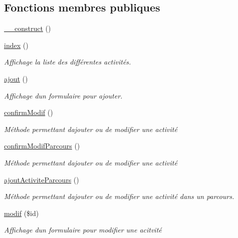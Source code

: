 \subsection*{Fonctions membres publiques}
\begin{DoxyCompactItemize}
\item 
\hyperlink{class_activites_a18b43832d87f4b797b324dfdaa29171d}{\+\_\+\+\_\+construct} ()
\item 
\hyperlink{class_activites_a3a55c12734928d60f6942a53f974d80a}{index} ()
\begin{DoxyCompactList}\small\item\em Affichage la liste des différentes activités. \end{DoxyCompactList}\item 
\hyperlink{class_activites_a0be751d825f434bea7bf35d1fcd883f1}{ajout} ()
\begin{DoxyCompactList}\small\item\em Affichage d\textquotesingle{}un formulaire pour ajouter. \end{DoxyCompactList}\item 
\hyperlink{class_activites_a6e26781843a8973781d641d1d78ae277}{confirm\+Modif} ()
\begin{DoxyCompactList}\small\item\em Méthode permettant d\textquotesingle{}ajouter ou de modifier une activité \end{DoxyCompactList}\item 
\hyperlink{class_activites_ad07bebfc4ff3edd4b6361f70e3005ff4}{confirm\+Modif\+Parcours} ()
\begin{DoxyCompactList}\small\item\em Méthode permettant d\textquotesingle{}ajouter ou de modifier une activité \end{DoxyCompactList}\item 
\hyperlink{class_activites_aab6de340e6a8da23b8573a70c4e9e1af}{ajout\+Activite\+Parcours} ()
\begin{DoxyCompactList}\small\item\em Méthode permettant d\textquotesingle{}ajouter ou de modifier une activité dans un parcours. \end{DoxyCompactList}\item 
\hyperlink{class_activites_a45a0e20a43963e87840e0c57f62f67d5}{modif} (\$id)
\begin{DoxyCompactList}\small\item\em Affichage d\textquotesingle{}un formulaire pour modifier une acitvité \end{DoxyCompactList}\item 

\end{DoxyCompactItemize}
